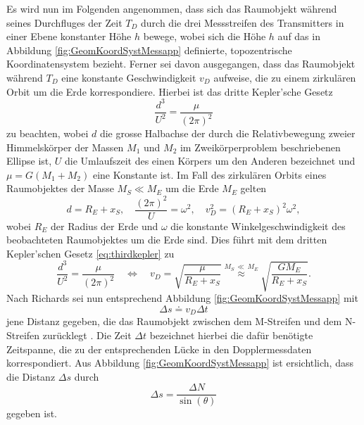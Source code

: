 \documentclass[a4paper,12pt]{article}
\numberwithin{equation}{section}
\begin{document}
Es wird nun im Folgenden angenommen, dass sich das Raumobjekt während seines Durchfluges der Zeit $T_D$ durch die drei Messstreifen des Transmitters in einer Ebene konstanter Höhe $h$ bewege, wobei sich die Höhe $h$ auf das in Abbildung \ref{fig:GeomKoordSystMessapp} definierte, topozentrische Koordinatensystem bezieht. Ferner sei davon ausgegangen, dass das Raumobjekt während $T_D$ eine konstante Geschwindigkeit $v_D$ aufweise, die zu einem zirkulären Orbit um die Erde korrespondiere. Hierbei ist das dritte Kepler'sche Gesetz \begin{equation}
\label{eq:thirdkepler} \frac{d^3}{U^2} = \frac{\mu}{(2\pi)^2}
\end{equation} zu beachten, wobei $d$ die grosse Halbachse der durch die Relativbewegung zweier Himmelskörper der Massen $M_1$ und $M_2$ im Zweikörperproblem beschriebenen Ellipse ist, $U$ die Umlaufszeit des einen Körpers um den Anderen bezeichnet und $\mu = G(M_1+M_2)$ eine Konstante ist. Im Fall des zirkulären Orbits eines Raumobjektes der Masse $M_S \ll M_E$ um die Erde $M_E$ gelten
\begin{equation}
d = R_E + x_S, \quad \frac{(2\pi)^2}{U} = \omega^2, \quad v_D^2 = (R_E+x_S)^2\omega^2,
\end{equation} wobei $R_E$ der Radius der Erde und $\omega$ die konstante Winkelgeschwindigkeit des beobachteten Raumobjektes um die Erde sind. Dies führt mit dem dritten Kepler'schen Gesetz \eqref{eq:thirdkepler} zu \begin{equation}\label{eq:obigres2} \frac{d^3}{U^2} = \frac{\mu}{(2\pi)^2} \quad \Leftrightarrow \quad v_D = \sqrt{\frac{\mu}{R_E + x_S}} \overset{M_S \,\ll\, M_E}{\approx} \sqrt{\frac{GM_E}{R_E+x_S}}.
\end{equation}
Nach Richards sei nun entsprechend Abbildung \ref{fig:GeomKoordSystMessapp} mit \begin{equation}
\Delta s \doteq v_D\Delta t
\end{equation} jene Distanz gegeben, die das Raumobjekt zwischen dem M-Streifen und dem N-Streifen zurücklegt \cite[S.1732]{Richards.1961}. Die Zeit $\Delta t$ bezeichnet hierbei die dafür benötigte Zeitspanne, die zu der entsprechenden Lücke in den Dopplermessdaten korrespondiert. Aus Abbildung \ref{fig:GeomKoordSystMessapp} ist ersichtlich, dass die Distanz $\Delta s$ durch \begin{equation}\label{eq:obigres}
\Delta s = \frac{\Delta N}{\sin(\theta)}
\end{equation} gegeben ist.
\end{document}
